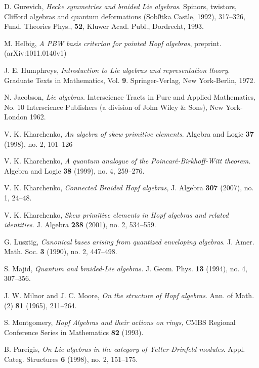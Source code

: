 \documentclass[english]{amsart}
\numberwithin{equation}{section}
\numberwithin{figure}{section}
\theoremstyle{plain}
\theoremstyle{definition}
\theoremstyle{definition}
\theoremstyle{remark}
\theoremstyle{remark}
\theoremstyle{plain}
\theoremstyle{plain}
\theoremstyle{plain}
\begin{document}
\begin{thebibliography}{}
 D. Gurevich, \emph{Hecke symmetries and
braided Lie algebras}. Spinors, twistors, Clifford algebras and quantum
deformations (Sob\'{0}tka Castle, 1992), 317--326, Fund. Theories Phys., \textbf{52}, Kluwer Acad. Publ., Dordrecht, 1993.

 M. Helbig, \emph{A PBW basis criterion for pointed Hopf algebras}, preprint. (arXiv:1011.0140v1) 

 J. E. Humphreys, \emph{Introduction to Lie
algebras and representation theory}. Graduate Texts in Mathematics,
Vol. \textbf{9}. Springer-Verlag, New York-Berlin, 1972.

N. Jacobson, \emph{Lie algebras.} Interscience
Tracts in Pure and Applied Mathematics, No. 10 Interscience Publishers
(a division of John Wiley \& Sons), New York-London 1962.

 V. K. Kharchenko, \emph{An algebra of
skew primitive elements}. Algebra and Logic \textbf{37} (1998), no. 2,
101--126

V. K. Kharchenko, \emph{A quantum
analogue of the Poincaré-Birkhoff-Witt theorem.} Algebra and Logic
\textbf{38} (1999), no. 4, 259--276.

 V. K. Kharchenko, \emph{Connected
Braided Hopf algebras,} J. Algebra \textbf{307} (2007), no. 1, 24--48. 

 V. K. Kharchenko, \emph{Skew primitive
elements in Hopf algebras and related identities}. J. Algebra \textbf{238}
(2001), no. 2, 534--559.

 G. Lusztig, \emph{Canonical bases arising from quantized enveloping algebras}.
J. Amer. Math. Soc. \textbf{3} (1990), no. 2, 447--498. 

 S. Majid, \emph{Quantum and braided-Lie algebras.} J. Geom. Phys. \textbf{13} (1994), no. 4, 307--356. 

 J. W. Milnor and J. C. Moore, \emph{On
the structure of Hopf algebras}. Ann. of Math. (2) \textbf{81} (1965),
211--264.

 S. Montgomery, \emph{Hopf Algebras and their
actions on rings,} CMBS Regional Conference Series in Mathematics
\textbf{82} (1993).

 B. Pareigis, \emph{On Lie algebras in the
category of Yetter-Drinfeld modules}. Appl. Categ. Structures \textbf{6}
(1998), no. 2, 151--175.


\end{thebibliography}
\end{document}
